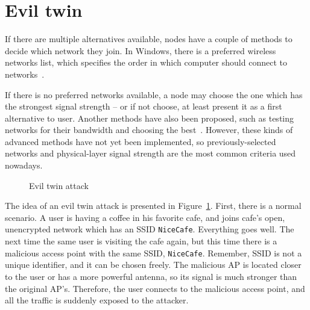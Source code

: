 \documentclass[12pt,a4paper,oneside,pdftex]{report}
\begin{document}
\section{Evil twin}
\label{sec:evil_twin}

If there are multiple alternatives available, nodes have a couple of methods to decide which network they join. In Windows, there is a preferred wireless networks list, which specifies the order in which computer should connect to networks~\cite{windows_wifi_preferred}. 

If there is no preferred networks available, a node may choose the one which has the strongest signal strength -- or if not choose, at least present it as a first alternative to user. Another methods have also been proposed, such as testing networks for their bandwidth and choosing the best~\cite{Nicholson:2006:APselection}. However, these kinds of advanced methods have not yet been implemented, so previously-selected networks and physical-layer signal strength are the most common criteria used nowadays.

\begin{figure}
    \begin{center}
    \caption{Evil twin attack}
    \label{fig:evil_twin}
    \end{center}
\end{figure}

The idea of an evil twin attack is presented in Figure~\ref{fig:evil_twin}. First, there is a normal scenario. A user is having a coffee in his favorite cafe, and joins cafe's open, unencrypted network which has an SSID \texttt{NiceCafe}. Everything goes well. The next time the same user is visiting the cafe again, but this time there is a malicious access point with the same SSID, \texttt{NiceCafe}. Remember, SSID is not a unique identifier, and it can be chosen freely. The malicious AP is located closer to the user or has a more powerful antenna, so its signal is much stronger than the original AP's. Therefore, the user connects to the malicious access point, and all the traffic is suddenly exposed to the attacker.
\end{document}
